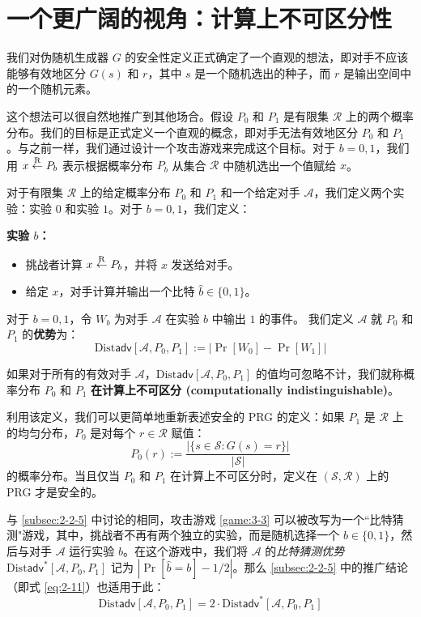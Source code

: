 \section{一个更广阔的视角：计算上不可区分性}\label{sec:3-11}

我们对伪随机生成器 $G$ 的安全性定义正式确定了一个直观的想法，即对手不应该能够有效地区分 $G(s)$ 和 $r$，其中 $s$ 是一个随机选出的种子，而 $r$ 是输出空间中的一个随机元素。

这个想法可以很自然地推广到其他场合。假设 $P_0$ 和 $P_1$ 是有限集 $\mathcal{R}$ 上的两个概率分布。我们的目标是正式定义一个直观的概念，即对手无法有效地区分 $P_0$ 和 $P_1$。与之前一样，我们通过设计一个攻击游戏来完成这个目标。对于 $b=0,1$，我们用 $x\overset{\rm R}\leftarrow P_b$ 表示根据概率分布 $P_b$ 从集合 $\mathcal R$ 中随机选出一个值赋给 $x$。

\begin{game}[区分 $P_0$ 和 $P_1$]\label{game:3-3}
对于有限集 $\mathcal{R}$ 上的给定概率分布 $P_0$ 和 $P_1$ 和一个给定对手 $\mathcal A$，我们定义两个实验：实验 $0$ 和实验 $1$。对于 $b=0,1$，我们定义：

\noindent\textbf{实验 $b$：}
\begin{itemize}
	\item 挑战者计算 $x\overset{\rm R}\leftarrow P_b$，并将 $x$ 发送给对手。
	\item 给定 $x$，对手计算并输出一个比特 $\hat b\in\{0,1\}$。
\end{itemize}
对于 $b=0,1$，令 $W_b$ 为对手 $\mathcal A$ 在实验 $b$ 中输出 $1$ 的事件。 我们定义 $\mathcal A$ 就 $P_0$ 和 $P_1$ 的\textbf{优势}为：
\[
\mathrm{Dist}\mathsf{adv}[\mathcal{A},P_0,P_1]
:=\big\lvert
\Pr[W_0]-\Pr[W_1]
\big\rvert
\]
\end{game}

\begin{definition}[计算上不可区分性]\label{def:3-4}
如果对于所有的有效对手 $\mathcal A$，$\mathrm{Dist}\mathsf{adv}[\mathcal{A},P_0,P_1]$ 的值均可忽略不计，我们就称概率分布 $P_0$ 和 $P_1$ \textbf{在计算上不可区分 (computationally indistinguishable)}。
\end{definition}

利用该定义，我们可以更简单地重新表述安全的 PRG 的定义：如果 $P_1$ 是 $\mathcal R$ 上的均匀分布，$P_0$ 是对每个 $r\in\mathcal R$ 赋值：
\[
P_0(r)
:=
\frac
{|\{s\in\mathcal{S}:G(s)=r\}|}
{|\mathcal{S}|}
\]
的概率分布。当且仅当 $P_0$ 和 $P_1$ 在计算上不可区分时，定义在 $(\mathcal S,\mathcal R)$ 上的 PRG 才是安全的。

与 \ref{subsec:2-2-5} 中讨论的相同，攻击游戏 \ref{game:3-3} 可以被改写为一个``比特猜测"游戏，其中，挑战者不再有两个独立的实验，而是随机选择一个 $b\in\{0,1\}$，然后与对手 $\mathcal A$ 运行实验 $b$。在这个游戏中，我们将 $\mathcal A$ 的\emph{比特猜测优势} $\mathrm{Dist}\mathsf{adv}^*[\mathcal{A},P_0,P_1]$ 记为 $|\Pr[\hat b=b]-{1}/{2}|$。那么 \ref{subsec:2-2-5} 中的推广结论（即式 \ref{eq:2-11}）也适用于此：
\begin{equation}
\mathrm{Dist}\mathsf{adv}[\mathcal{A},P_0,P_1]
=2\cdot
\mathrm{Dist}\mathsf{adv}^*[\mathcal{A},P_0,P_1]
\end{equation}

